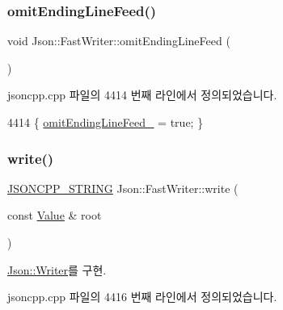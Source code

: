 \subsubsection{\texorpdfstring{omit\+Ending\+Line\+Feed()}{omitEndingLineFeed()}}
{\footnotesize\ttfamily void Json\+::\+Fast\+Writer\+::omit\+Ending\+Line\+Feed (\begin{DoxyParamCaption}{ }\end{DoxyParamCaption})}



jsoncpp.\+cpp 파일의 4414 번째 라인에서 정의되었습니다.


\begin{DoxyCode}
4414 \{ \hyperlink{class_json_1_1_fast_writer_abd6e13851db6dcf59d84af68d48d50ac}{omitEndingLineFeed\_} = \textcolor{keyword}{true}; \}
\end{DoxyCode}
\mbox{\label{class_json_1_1_fast_writer_a93d45ba4bc312371d08beb3e3dfbe654}} 
\subsubsection{\texorpdfstring{write()}{write()}}
{\footnotesize\ttfamily \hyperlink{json_8h_a1e723f95759de062585bc4a8fd3fa4be}{J\+S\+O\+N\+C\+P\+P\+\_\+\+S\+T\+R\+I\+NG} Json\+::\+Fast\+Writer\+::write (\begin{DoxyParamCaption}\item[{const \hyperlink{class_json_1_1_value}{Value} \&}]{root }\end{DoxyParamCaption})\hspace{0.3cm}{\ttfamily [virtual]}}



\hyperlink{class_json_1_1_writer_a61c55882b82c7651d0b9b683c6d3f371}{Json\+::\+Writer}를 구현.



jsoncpp.\+cpp 파일의 4416 번째 라인에서 정의되었습니다.


